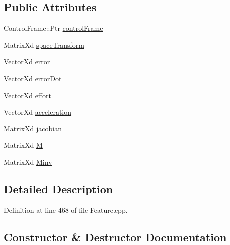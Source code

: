 \subsection*{Public Attributes}
\begin{DoxyCompactItemize}
\item 
Control\+Frame\+::\+Ptr \hyperlink{structocra_1_1OrientationFeature_1_1Pimpl_ace6d37214be072ece7305a45e35569c8}{control\+Frame}
\item 
Matrix\+Xd \hyperlink{structocra_1_1OrientationFeature_1_1Pimpl_aabbe93797831b01bda2453053e2a1224}{space\+Transform}
\item 
Vector\+Xd \hyperlink{structocra_1_1OrientationFeature_1_1Pimpl_ac388b9a7c770d1c5af07c5b8f011a430}{error}
\item 
Vector\+Xd \hyperlink{structocra_1_1OrientationFeature_1_1Pimpl_ad7b019fb36061c7906b7d68cd107a542}{error\+Dot}
\item 
Vector\+Xd \hyperlink{structocra_1_1OrientationFeature_1_1Pimpl_a4e6285f990db663f2c73f629ae854650}{effort}
\item 
Vector\+Xd \hyperlink{structocra_1_1OrientationFeature_1_1Pimpl_a71af076a18a38a72ec80d781b03b391b}{acceleration}
\item 
Matrix\+Xd \hyperlink{structocra_1_1OrientationFeature_1_1Pimpl_ae01a611368d744168c0b1cb036e9f3ca}{jacobian}
\item 
Matrix\+Xd \hyperlink{structocra_1_1OrientationFeature_1_1Pimpl_aad4500eb6e53d95fa7727e448616a312}{M}
\item 
Matrix\+Xd \hyperlink{structocra_1_1OrientationFeature_1_1Pimpl_a4d3638027be99fabf73eefd55015ce44}{Minv}
\end{DoxyCompactItemize}


\subsection{Detailed Description}


Definition at line 468 of file Feature.\+cpp.



\subsection{Constructor \& Destructor Documentation}
\hypertarget{structocra_1_1OrientationFeature_1_1Pimpl_aa5a7e987e6c60ebd03c2acb696f85258}{}\label{structocra_1_1OrientationFeature_1_1Pimpl_aa5a7e987e6c60ebd03c2acb696f85258} 
